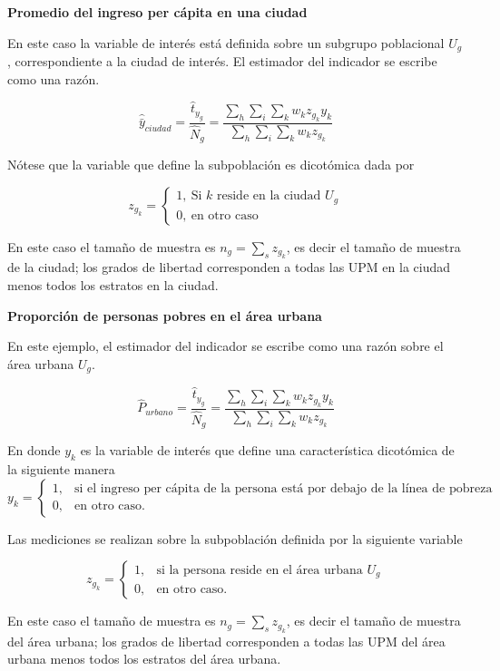 \documentclass[
  10pt,
  spanish,
]{book}
\begin{document}
\textbf{Promedio del ingreso per cápita en una ciudad}

En este caso la variable de interés está definida sobre un subgrupo poblacional \(U_g\), correspondiente a la ciudad de interés. El estimador del indicador se escribe como una razón.

\[
\hat {\bar y}_{ciudad}= \frac{\hat t_{y_g}}{\hat N_g} =\frac{\sum_h\sum_i\sum_k w_kz_{g_k}y_{k}}{\sum_h\sum_i\sum_k w_kz_{g_k}}
\]

Nótese que la variable que define la subpoblación es dicotómica dada por

\[ 
z_{g_k}=
\begin{cases}
1, \ \text{Si $k$ reside en la ciudad $U_g$} \\
0, \ \text{en otro caso}
\end{cases}
\]

En este caso el tamaño de muestra es \(n_g = \sum_s z_{g_k}\), es decir el tamaño de muestra de la ciudad; los grados de libertad corresponden a todas las UPM en la ciudad menos todos los estratos en la ciudad.

\textbf{Proporción de personas pobres en el área urbana}

En este ejemplo, el estimador del indicador se escribe como una razón sobre el área urbana \(U_g\).

\[
\hat{P}_{urbano} = \frac{\hat t_{y_g}}{\hat N_g} =\frac{\sum_h\sum_i\sum_k w_kz_{g_k}y_{k}}{\sum_h\sum_i\sum_k w_kz_{g_k}}
\]

En donde \(y_{k}\) es la variable de interés que define una característica dicotómica de la siguiente manera
\[
y_k=
\begin{cases}
1, &\text{si el ingreso per cápita de la persona está por debajo de la línea de pobreza}\\
0, &\text{en otro caso.}
\end{cases}
\]

Las mediciones se realizan sobre la subpoblación definida por la siguiente variable

\[
z_{g_k}=
\begin{cases}
1, &\text{si la persona reside en el área urbana $U_g$}\\
0, &\text{en otro caso.}
\end{cases}
\]

En este caso el tamaño de muestra es \(n_g = \sum_s z_{g_k}\), es decir el tamaño de muestra del área urbana; los grados de libertad corresponden a todas las UPM del área urbana menos todos los estratos del área urbana.
\end{document}
